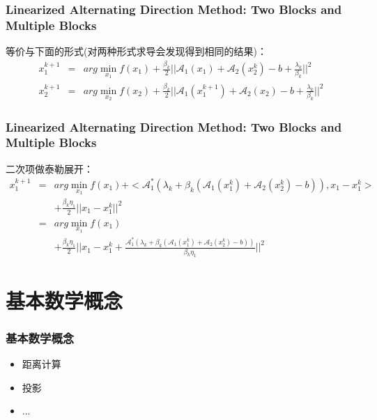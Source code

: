 \documentclass[notheorems,mathserif,table,compress]{beamer}  %
\begin{document}
\begin{frame}
\frametitle{Linearized Alternating Direction Method: Two Blocks and Multiple Blocks}

等价与下面的形式(对两种形式求导会发现得到相同的结果)：
\begin{equation}
\begin{array}{ccc}
x_1^{k+1} & = & arg \min_{x_1} f(x_1)+\frac{\beta_k}{2}||\mathcal{A}_1(x_1)+\mathcal{A}_2(x_2^k)-b+\frac{\lambda_k}{\beta_k}||^2\\
x_2^{k+1} & = & arg \min_{x_2} f(x_2)+\frac{\beta_k}{2}||\mathcal{A}_1(x_1^{k+1})+\mathcal{A}_2(x_2)-b+\frac{\lambda_k}{\beta_k}||^2
\end{array}
\end{equation}
\end{frame}

\begin{frame}
\frametitle{Linearized Alternating Direction Method: Two Blocks and Multiple Blocks}
二次项做泰勒展开：
\begin{eqnarray}
x_1^{k+1} & = & arg \min_{x_1} f(x_1)+<\mathcal{A}_1^*(\lambda_k+\beta_k(\mathcal{A}_1(x_1^k)+\mathcal{A}_2(x_2^k)-b)),x_1-x_1^k>\\
\nonumber
&&+\frac{\beta_k\eta_1}{2}||x_1-x_1^k||^2\\
& = & arg \min_{x_1} f(x_1)
\\
\nonumber
&& +\frac{\beta_k\eta_1}{2}||x_1-x_1^k+\frac{\mathcal{A}_1^*(\lambda_k+\beta_k(\mathcal{A}_1(x_1^k)+\mathcal{A}_2(x_2^k)-b))}{\beta_k\eta_1}||^2
\end{eqnarray}
\end{frame}

\section{基本数学概念}
\begin{frame}
\frametitle{基本数学概念}
\begin{itemize}
\item 距离计算
\item 投影
\item ...
\end{itemize}
\end{frame}
\end{document}
